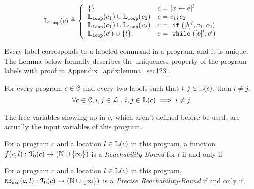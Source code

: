 \begin{defn}
  \label{def:loopl}
  $$
  \loopl(c) \triangleq 
  \left\{
    \begin{array}{ll}
      \{\}  & {c} = [{\assign x e}]^{l} \\
      \loopl({c_1}) \cup \loopl({{c_2}})  & {c} = {c_1};{c_2} \\
      \loopl(c_1) \cup \loopl({{c_2}})   & {c} =\eif([\bexpr]^{l}, c_1, c_2) \\
  \loopl(c') \cup \{l\}, &  {c}   = \ewhile ([\bexpr]^{l}, {c}')
  \end{array}
\right.
  $$
  \end{defn}
%
Every label corresponds to a labeled command in a program, and it is unique.
The Lemma below formally describes the uniqueness property of the program labels
with proof in Appendix~\ref{apdx:lemma_sec123}.
\begin{lem}
  \label{lem:label_unique}
  For every program $c \in \mathcal{C}$ and every two labels such that
  $i, j \in \mathbb{L}(c)$, then $i \neq j$.
  \[
    \forall c \in \mathcal{C}, i, j \in \mathcal{L} ~.~ i, j \in \mathbb{L}(c)\implies i \neq j.
    \]
\end{lem}
%
The free variables
showing up in $c$, which aren't defined before be used, are actually the input variables of this program.
%
\begin{defn}
  \label{def:rb}
  For a program ${c}$ and a location $l \in \mathbb{L}(c)$ in this program,
a function $f(c, l) : \mathcal{T}_0(c) \to (\mathbb{N} \cup \{\infty\})$ is a \emph{Reachability-Bound} for $l$ if and only if
\end{defn}
\begin{defn}
  \label{def:exe_rb}
  For a program ${c}$ and a location $l \in \mathbb{L}(c)$ in this program,
$\mathtt{RB_{exe}}({c}, l): \mathcal{T}_0(c) \to (\mathbb{N} \cup \{\infty\})$ is a \emph{Precise Reachability-Bound}  if and only if,
\highlight{
\[
  \forall \trace_0 \in \tdom_0(c) \st \exists \trace \in \inftdom, c' \in \cdom \st 
  \Big(
    \config{{c}, \trace_0} \to^{*} \config{c', \trace_0 \tracecat \vtrace} 
  \Big)
  \implies \exeRB({c}, l)(\trace_0) = \vcounter(\vtrace, l) 
  \]
}
\end{defn}
